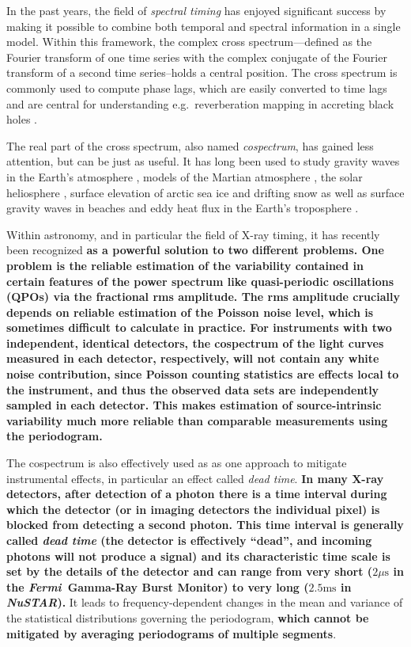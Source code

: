 \documentclass[12pt]{emulateapj}
\newcommand{\project}[1]{\textsl{#1}}
\newcommand{\nustar}{\project{NuSTAR}\xspace}
\newcommand{\fermi}{\project{Fermi}\xspace}
\begin{document}
In the past years, the field of \textit{spectral timing} has enjoyed significant success by making it possible to combine both temporal and spectral information in a single model. Within this framework, the complex cross spectrum---defined as the Fourier transform of one time series with the complex conjugate of the Fourier transform of a second time series--holds a central position. The cross spectrum is commonly used to compute phase lags, which are easily converted to time lags and are central for understanding e.g.\ reverberation mapping in accreting black holes \citep[see][for a recent review]{uttley2014}. 

The real part of the cross spectrum, also named \textit{cospectrum}, has gained less attention, but can be just as useful. It has long been used to study gravity waves in the Earth's atmosphere \citep[e.g.][]{john2016}, models of the Martian atmosphere \citep[e.g.][]{wang2016}, the solar heliosphere \citep[e.g.][]{vigeesh2017}, surface elevation of arctic sea ice \citep[e.g.][]{ardhuin2016} and drifting snow \citep[e.g.][]{paterna2016} as well as surface gravity waves in beaches \citep[e.g.][]{fiedler2015} and eddy heat flux in the Earth's troposphere \citep[e.g.][]{wang2015,zurita-gotor2017}.

Within astronomy, and in particular the field of X-ray timing, it has recently been recognized \textbf{as a powerful solution to two different problems. One problem is the reliable estimation of the variability contained in certain features of the power spectrum like quasi-periodic oscillations (QPOs) via the fractional rms amplitude. The rms amplitude crucially depends on reliable estimation of the Poisson noise level, which is sometimes difficult to calculate in practice. For instruments with two independent, identical detectors, the cospectrum of the light curves measured in each detector, respectively, will not contain any white noise contribution, since Poisson counting statistics are effects local to the instrument, and thus the observed data sets are independently sampled in each detector. This makes estimation of source-intrinsic variability much more reliable than comparable measurements using the periodogram.}

The cospectrum is also effectively used as as one approach to mitigate instrumental effects, in particular an effect called \textit{dead time}. \textbf{In many X-ray detectors, after detection of a photon there is a time interval during which the detector (or in imaging detectors the individual pixel) is blocked from detecting a second photon. This time interval is generally called \textit{dead time} (the detector is effectively ``dead'', and incoming photons will not produce a signal) and its characteristic time scale is set by the details of the detector and can range from very short ($2\mu\mathrm{s}$ in the \fermi\ Gamma-Ray Burst Monitor) to very long ($2.5\mathrm{ms}$ in \nustar).} It leads to frequency-dependent changes in the mean and variance of the statistical distributions governing the periodogram, \textbf{which cannot be mitigated by averaging periodograms of multiple segments}.
\end{document}

